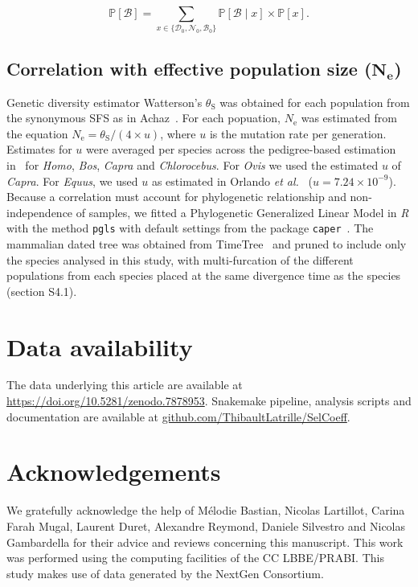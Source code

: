 \documentclass[10pt,letterpaper]{article}
\newcommand{\Ne}{N_{\text{e}}}
\newcommand{\proba}{\mathbb{P}}
\newcommand{\SphyDel}{\mathcal{D}_0}
\newcommand{\SphyNeu}{\mathcal{N}_0}
\newcommand{\SphyBen}{\mathcal{B}_0}
\newcommand{\Sphyclass}{x}
\newcommand{\given}{\mid}
\newcommand{\SpopBen}{\mathcal{B}}
\newcommand{\thetaSyn}{\theta_{\text{S}}}
\begin{document}
\begin{equation}
\proba [ \SpopBen ] = \sum_{\Sphyclass \in \{\SphyDel, \SphyNeu, \SphyBen \} }\proba [\SpopBen \given \Sphyclass ] \times \proba [\Sphyclass ].
\label{eq:total_proba}
\end{equation}

\subsection{Correlation with effective population size (\texorpdfstring{$\bm{\Ne}$}{Nₑ})}
\label{subsec:correlation-diversity}
Genetic diversity estimator Watterson's $\thetaSyn$ was obtained for each population from the synonymous SFS as in Achaz~\cite{achaz_frequency_2009}.
For each popuation, $\Ne$ was estimated from the equation $\Ne=\thetaSyn / (4 \times u)$, where $u$ is the mutation rate per generation.
Estimates for $u$ were averaged per species across the pedigree-based estimation in~\cite{bergeron_evolution_2023} for \textit{Homo}, \textit{Bos}, \textit{Capra} and \textit{Chlorocebus}.
For \textit{Ovis} we used the estimated $u$ of \textit{Capra}.
For \textit{Equus}, we used $u$ as estimated in Orlando \textit{et al.}~\cite{orlando_recalibrating_2013} ($u=7.24\times10^{-9}$).
Because a correlation must account for phylogenetic relationship and non-independence of samples, we fitted a Phylogenetic Generalized Linear Model in \textit{R} with the method \texttt{pgls} with default settings from the package \texttt{caper}~\cite{orme_caper_2013}.
The mammalian dated tree was obtained from TimeTree~\cite{kumar_timetree_2017} and pruned to include only the species analysed in this study, with multi-furcation of the different populations from each species placed at the same divergence time as the species (section S4.1).

\section*{Data availability}
The data underlying this article are available at \url{https://doi.org/10.5281/zenodo.7878953}.
Snakemake pipeline, analysis scripts and documentation are available at \href{https://github.com/ThibaultLatrille/SelCoeff}{github.com/ThibaultLatrille/SelCoeff}.

\section*{Acknowledgements}
\label{sec:acknowledgment}
We gratefully acknowledge the help of Mélodie Bastian, Nicolas Lartillot, Carina Farah Mugal, Laurent Duret, Alexandre Reymond, Daniele Silvestro and Nicolas Gambardella for their advice and reviews concerning this manuscript.
This work was performed using the computing facilities of the CC LBBE/PRABI\@.
This study makes use of data generated by the NextGen Consortium.
\end{document}
